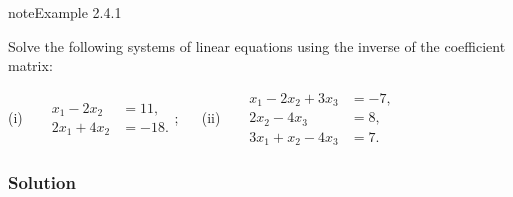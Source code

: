 \documentclass[letterpaper,10pt,english]{jupyterBook}
\begin{document}
\label{_pages/2.1_Solving_using_inverse_matrix:solution-by-inverse-example}
\begin{sphinxadmonition}{note}{Example 2.4.1}



\sphinxAtStartPar
Solve the following systems of linear equations using the inverse of the coefficient matrix:

\sphinxAtStartPar
(i)   \(\begin{array}{rl}
        x_1 - 2x_2  \!\!\!\! &= 11, \\
        2x_1 + 4x_2  \!\!\!\! &= -18.
    \end{array}\);  
(ii)   \(\begin{array}{rl}
        x_1 - 2x_2 + 3x_3 \!\!\!\! &= -7, \\
        2x_2 - 4x_3  \!\!\!\! &= 8, \\
        3x_1 + x_2 - 4x_3  \!\!\!\! &= 7.
    \end{array}\)
\subsubsection*{Solution}


\end{sphinxadmonition}
\end{document}
